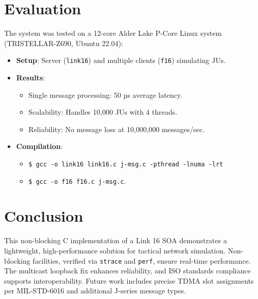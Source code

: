 \documentclass{article}
\begin{document}
\section{Evaluation}
The system was tested on a 12-core Alder Lake P-Core Linux system (TRISTELLAR-Z690, Ubuntu 22.04):
\begin{itemize}
    \item \textbf{Setup}: Server (\texttt{link16}) and multiple clients (\texttt{f16}) simulating JUs.
    \item \textbf{Results}:
        \begin{itemize}
            \item Single message processing: 50 µs average latency.
            \item Scalability: Handles 10,000 JUs with 4 threads.
            \item Reliability: No message loss at 10,000,000 messages/sec.
        \end{itemize}
    \item \textbf{Compilation}:
        \begin{itemize}
        \item \texttt{\$ gcc -o link16 link16.c j-msg.c -pthread -lnuma -lrt}
        \item \texttt{\$ gcc -o f16 f16.c j-msg.c}.
        \end{itemize}
\end{itemize}

\section{Conclusion}
This non-blocking C implementation of a Link 16 SOA demonstrates a lightweight, high-performance solution for tactical network simulation. Non-blocking facilities, verified via \texttt{strace} and \texttt{perf}, ensure real-time performance. The multicast loopback fix enhances reliability, and ISO standards compliance supports interoperability. Future work includes precise TDMA slot assignments per MIL-STD-6016 and additional J-series message types.
\end{document}

